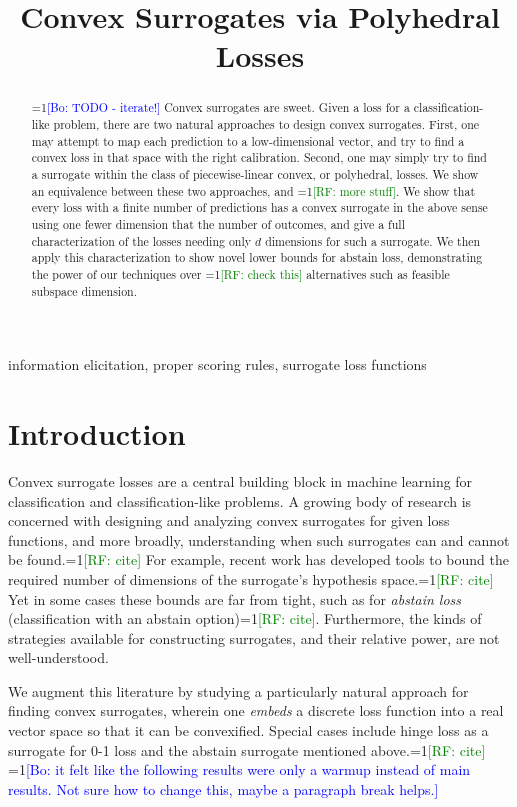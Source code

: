 \documentclass[anon,12pt]{colt2019}
\title{Convex Surrogates via Polyhedral Losses}
\newcommand{\Comments}{1}
\newcommand{\mynote}[2]{\ifnum\Comments=1\textcolor{#1}{#2}\fi}
\newcommand{\raf}[1]{\mynote{green}{[RF: #1]}}
\newcommand{\bo}[1]{\mynote{blue}{[Bo: #1]}}
\begin{document}
\maketitle

\begin{abstract}
  \bo{TODO - iterate!}
  Convex surrogates are sweet.
  Given a loss for a classification-like problem, there are two natural approaches to design convex surrogates.
  First, one may attempt to map each prediction to a low-dimensional vector, and try to find a convex loss in that space with the right calibration.
  Second, one may simply try to find a surrogate within the class of piecewise-linear convex, or polyhedral, losses.
  We show an equivalence between these two approaches, and \raf{more stuff}.
  We show that every loss with a finite number of predictions has a convex surrogate in the above sense using one fewer dimension that the number of outcomes, and give a full characterization of the losses needing only $d$ dimensions for such a surrogate.
  We then apply this characterization to show novel lower bounds for abstain loss, demonstrating the power of our techniques over \raf{check this} alternatives such as feasible subspace dimension.
\end{abstract}
\begin{keywords}%
  information elicitation, proper scoring rules, surrogate loss functions
\end{keywords}

\section{Introduction}\label{sec:intro}

Convex surrogate losses are a central building block in machine learning for classification and classification-like problems.
A growing body of research is concerned with designing and analyzing convex surrogates for given loss functions, and more broadly, understanding when such surrogates can and cannot be found.\raf{cite}
For example, recent work has developed tools to bound the required number of dimensions of the surrogate's hypothesis space.\raf{cite}
Yet in some cases these bounds are far from tight, such as for \emph{abstain loss} (classification with an abstain option)\raf{cite}.
Furthermore, the kinds of strategies available for constructing surrogates, and their relative power, are not well-understood.

We augment this literature by studying a particularly natural approach for finding convex surrogates, wherein one \emph{embeds} a discrete loss function into a real vector space so that it can be convexified.
Special cases include hinge loss as a surrogate for 0-1 loss and the abstain surrogate mentioned above.\raf{cite}
\bo{it felt like the following results were only a warmup instead of main results. Not sure how to change this, maybe a paragraph break helps.}
\end{document}
